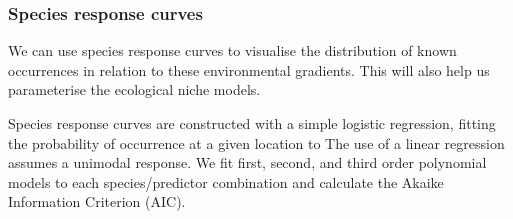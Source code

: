 \documentclass[]{article}
\begin{document}
\hypertarget{species-response-curves}{%
\subsubsection{Species response curves}\label{species-response-curves}}

We can use species response curves to visualise the distribution of
known occurrences in relation to these environmental gradients. This
will also help us parameterise the ecological niche models.

Species response curves are constructed with a simple logistic
regression, fitting the probability of occurrence at a given location to
The use of a linear regression assumes a unimodal response. We fit
first, second, and third order polynomial models to each
species/predictor combination and calculate the Akaike Information
Criterion (AIC).
\end{document}
